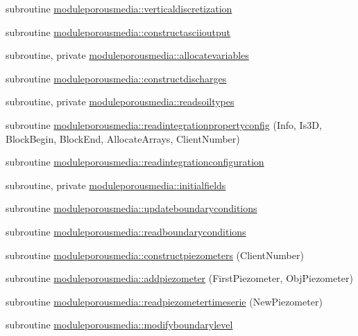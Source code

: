 \begin{DoxyCompactItemize}
\item 
subroutine \mbox{\hyperlink{namespacemoduleporousmedia_ac906d07242e6b29b7b3f0b0984c50530}{moduleporousmedia\+::verticaldiscretization}}
\item 
subroutine \mbox{\hyperlink{namespacemoduleporousmedia_a14d726826714b21efcb1bdd8fe521dbc}{moduleporousmedia\+::constructasciioutput}}
\item 
subroutine, private \mbox{\hyperlink{namespacemoduleporousmedia_a908fc394580adaa43494724ec7882eca}{moduleporousmedia\+::allocatevariables}}
\item 
subroutine \mbox{\hyperlink{namespacemoduleporousmedia_ac4e498c09f58d0ecca6f79a2a268bb84}{moduleporousmedia\+::constructdischarges}}
\item 
subroutine, private \mbox{\hyperlink{namespacemoduleporousmedia_a7aef95520258c11f2ce4493e2bef61c8}{moduleporousmedia\+::readsoiltypes}}
\item 
subroutine \mbox{\hyperlink{namespacemoduleporousmedia_af773f6dce68c6222d17ca3f4fe88192d}{moduleporousmedia\+::readintegrationpropertyconfig}} (Info, Is3D, Block\+Begin, Block\+End, Allocate\+Arrays, Client\+Number)
\item 
subroutine \mbox{\hyperlink{namespacemoduleporousmedia_afd9c6f0efb919260c9cb27d5f27faf98}{moduleporousmedia\+::readintegrationconfiguration}}
\item 
subroutine, private \mbox{\hyperlink{namespacemoduleporousmedia_a35c831104f825a9f11f297800f87ecab}{moduleporousmedia\+::initialfields}}
\item 
subroutine \mbox{\hyperlink{namespacemoduleporousmedia_ab48cf69fc08a66f3d4cfa5d9624e5ebf}{moduleporousmedia\+::updateboundaryconditions}}
\item 
subroutine \mbox{\hyperlink{namespacemoduleporousmedia_afc9e4c782508e0d8b55b1c444d54d741}{moduleporousmedia\+::readboundaryconditions}}
\item 
subroutine \mbox{\hyperlink{namespacemoduleporousmedia_ac3173bc46df00d4f9eeea325d87cd8d7}{moduleporousmedia\+::constructpiezometers}} (Client\+Number)
\item 
subroutine \mbox{\hyperlink{namespacemoduleporousmedia_a367419c3e235d10645f9a8ef04d062b8}{moduleporousmedia\+::addpiezometer}} (First\+Piezometer, Obj\+Piezometer)
\item 
subroutine \mbox{\hyperlink{namespacemoduleporousmedia_ab8846ea02c912ad7abc75b7736e11552}{moduleporousmedia\+::readpiezometertimeserie}} (New\+Piezometer)
\item 
subroutine \mbox{\hyperlink{namespacemoduleporousmedia_a92e9c5aa327b8fb0f60c057a8885230d}{moduleporousmedia\+::modifyboundarylevel}}

\end{DoxyCompactItemize}
